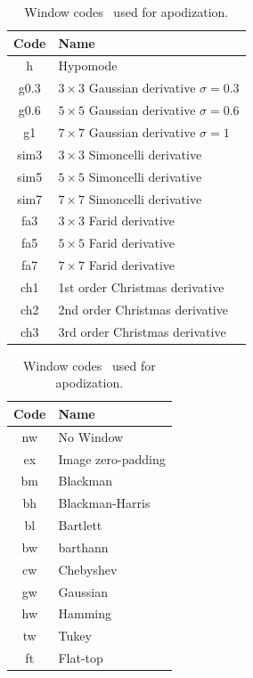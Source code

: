 \begin{table}[htpb]
\centering
\scriptsize
\begin{minipage}[t]{.38\textwidth}
\vspace{0pt}
\begin{tabular}{c|l}
Code & Name\\ \hline
h & Hypomode \\
g0.3 & $3 \times 3$ Gaussian derivative $\sigma=0.3$\\
g0.6 & $5 \times 5$ Gaussian derivative $\sigma=0.6$\\
g1 & $7 \times 7$ Gaussian derivative $\sigma=1$\\
sim3 & $3 \times 3$ Simoncelli derivative \\
sim5 & $5 \times 5$ Simoncelli derivative \\
sim7 & $7 \times 7$ Simoncelli derivative \\
fa3 & $3 \times 3$ Farid derivative \\
fa5 & $5 \times 5$ Farid derivative \\
fa7 & $7 \times 7$ Farid derivative \\
ch1 & 1st order Christmas derivative \\
ch2 & 2nd order Christmas derivative \\
ch3 & 3rd order Christmas derivative \\ \hline	
\end{tabular}
\caption{\scriptsize{Evaluated gradient estimation method codes \grParam.}}	
\label{tab:gradEstimationGBSE}
\end{minipage}%
\begin{minipage}[t]{.25\textwidth}
\vspace{0pt}
\begin{tabular}{c|l}
Code & Name\\ \hline
nw & No Window\\
ex & Image zero-padding\\
bm & Blackman\\
bh & Blackman-Harris \\
bl & Bartlett \\
bw & barthann  \\
cw & Chebyshev\\
gw & Gaussian\\
hw & Hamming \\
tw & Tukey \\
ft & Flat-top\\ \hline	
\end{tabular}
\caption{\scriptsize{Window codes \winParam \ used for apodization.}}	

\end{minipage}
\end{table}
